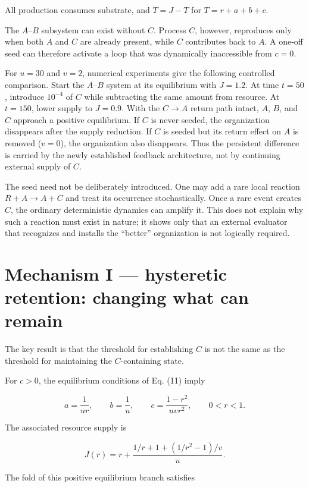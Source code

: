 \documentclass[11pt,a4paper]{article}
\begin{document}
All production consumes substrate, and \(\dot T = J - T\) for
\(T = r+a+b+c\).

The \(A\)--\(B\) subsystem can exist without \(C\). Process \(C\),
however, reproduces only when both \(A\) and \(C\) are already present,
while \(C\) contributes back to \(A\). A one-off seed can therefore
activate a loop that was dynamically inaccessible from \(c=0\).

For \(u=30\) and \(v=2\), numerical experiments give the following
controlled comparison. Start the \(A\)--\(B\) system at its equilibrium
with \(J=1.2\). At time \(t=50\), introduce \(10^{-4}\) of \(C\) while
subtracting the same amount from resource. At \(t=150\), lower supply to
\(J=0.9\). With the \(C \to A\) return path intact, \(A\), \(B\), and
\(C\) approach a positive equilibrium. If \(C\) is never seeded, the
organization disappears after the supply reduction. If \(C\) is seeded
but its return effect on \(A\) is removed (\(v=0\)), the organization
also disappears. Thus the persistent difference is carried by the newly
established feedback architecture, not by continuing external supply of
\(C\).

The seed need not be deliberately introduced. One may add a rare local
reaction \(R+A \to A+C\) and treat its occurrence stochastically. Once a
rare event creates \(C\), the ordinary deterministic dynamics can
amplify it. This does not explain why such a reaction must exist in
nature; it shows only that an external evaluator that recognizes and
installs the ``better'' organization is not logically required.

\section{Mechanism I --- hysteretic retention: changing what can
remain}\label{mechanism-i-hysteretic-retention-changing-what-can-remain}

The key result is that the threshold for establishing \(C\) is not the
same as the threshold for maintaining the \(C\)-containing state.

For \(c>0\), the equilibrium conditions of Eq. (11) imply

\[
a = \frac{1}{ur}, \qquad b = \frac{1}{u}, \qquad c = \frac{1-r^2}{uvr^2}, \qquad 0<r<1.
\]

The associated resource supply is

\[
J(r) = r + \frac{1/r + 1 + (1/r^2-1)/v}{u}. \tag{12}
\]

The fold of this positive equilibrium branch satisfies
\end{document}
